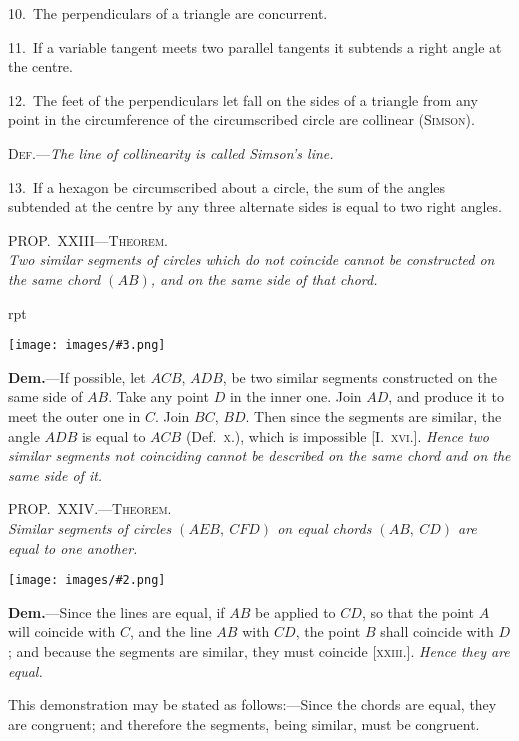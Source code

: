 \documentclass[oneside]{book}
\newcounter{wrapwidth}
\newcommand\myprop[2]{
\bigskip\Needspace*{4\baselineskip}\begin{center}\textsc{#1}\\\medskip\emph{#2}\par\end{center}
}
\newcommand\imgflow[3]{
\setcounter{wrapwidth}{#1}
\begin{wrapfigure}[#2]{r}{\value{wrapwidth}pt}
\begin{center}
\vspace{-0.3in}
\texttt{[image: images/\#3.png]}
\end{center}
\end{wrapfigure}
}
\newcommand\imgcent[2]{
\begin{center}
\texttt{[image: images/\#2.png]}
\end{center}
}
\begin{document}
\begin{footnotesize}
10.~The perpendiculars of a triangle are concurrent.

11.~If a variable tangent meets two parallel tangents it subtends
a right angle at the centre.

12.~The feet of the perpendiculars let fall on the sides of a
triangle from any point in the circumference of the circumscribed
circle are collinear (\textsc{Simson}).

\textsc{Def.}---\emph{The line of collinearity is called Simson's line.}

13.~If a hexagon be circumscribed about a circle, the sum of
the angles subtended at the centre by any three alternate sides is
equal to two right angles.
\par\end{footnotesize}

\myprop{PROP\@.~XXIII---Theorem.}{Two similar segments of circles which do not coincide
cannot be constructed on the same chord $(AB)$, and on the
same side of that chord.}

\imgflow{145}{5}{f130}

\textbf{Dem.}---If possible, let $ACB$, $ADB$, be two similar
segments constructed on the same side of $AB$. Take
any point $D$ in the inner one. Join $AD$, and produce
it to meet the outer one in $C$.
Join $BC$, $BD$. Then since
the segments are similar,
the angle $ADB$ is equal to
$ACB$ (Def.~\textsc{x.}), which is impossible
[I.~\textsc{xvi.}]. \emph{Hence two similar segments not coinciding
cannot be described on the same chord and on the
same side of it.}

\myprop{PROP\@.~XXIV\@.---Theorem.}{Similar segments of circles $(AEB,\ CFD)$ on equal chords
$(AB,\ CD)$ are equal to one another.}

\imgcent{300}{f131}

\textbf{Dem.}---Since the lines are equal, if $AB$ be applied
to $CD$, so that the point $A$ will coincide with $C$, and
the line $AB$ with $CD$, the point $B$ shall coincide with
$D$; and because the segments are similar, they must
coincide [\textsc{xxiii.}]. \emph{Hence they are equal.}\par\medskip

\begin{footnotesize}
This demonstration may be stated as follows:---Since the chords
are equal, they are congruent; and therefore the segments, being
similar, must be congruent.
\par\end{footnotesize}
\end{document}
